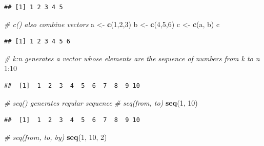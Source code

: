 \documentclass[]{book}
\newenvironment{Shaded}{\begin{snugshade}}{\end{snugshade}}
\newcommand{\KeywordTok}[1]{\textcolor[rgb]{0.13,0.29,0.53}{\textbf{{#1}}}}
\newcommand{\DecValTok}[1]{\textcolor[rgb]{0.00,0.00,0.81}{{#1}}}
\newcommand{\StringTok}[1]{\textcolor[rgb]{0.31,0.60,0.02}{{#1}}}
\newcommand{\CommentTok}[1]{\textcolor[rgb]{0.56,0.35,0.01}{\textit{{#1}}}}
\newcommand{\NormalTok}[1]{{#1}}
\begin{document}
\begin{verbatim}
## [1] 1 2 3 4 5
\end{verbatim}

\begin{Shaded}
\begin{Highlighting}[]
\CommentTok{# c() also combine vectors}
\NormalTok{a <-}\StringTok{ }\KeywordTok{c}\NormalTok{(}\DecValTok{1}\NormalTok{,}\DecValTok{2}\NormalTok{,}\DecValTok{3}\NormalTok{)}
\NormalTok{b <-}\StringTok{ }\KeywordTok{c}\NormalTok{(}\DecValTok{4}\NormalTok{,}\DecValTok{5}\NormalTok{,}\DecValTok{6}\NormalTok{)}
\NormalTok{c <-}\StringTok{ }\KeywordTok{c}\NormalTok{(a, b)}
\NormalTok{c}
\end{Highlighting}
\end{Shaded}

\begin{verbatim}
## [1] 1 2 3 4 5 6
\end{verbatim}

\begin{Shaded}
\begin{Highlighting}[]
\CommentTok{# k:n generates a vector whose elements are the sequence of numbers from k to n}
\DecValTok{1}\NormalTok{:}\DecValTok{10}
\end{Highlighting}
\end{Shaded}

\begin{verbatim}
##  [1]  1  2  3  4  5  6  7  8  9 10
\end{verbatim}

\begin{Shaded}
\begin{Highlighting}[]
\CommentTok{# seq() generates regular sequence}
\CommentTok{# seq(from, to)}
\KeywordTok{seq}\NormalTok{(}\DecValTok{1}\NormalTok{, }\DecValTok{10}\NormalTok{)}
\end{Highlighting}
\end{Shaded}

\begin{verbatim}
##  [1]  1  2  3  4  5  6  7  8  9 10
\end{verbatim}

\begin{Shaded}
\begin{Highlighting}[]
\CommentTok{# seq(from, to, by)}
\KeywordTok{seq}\NormalTok{(}\DecValTok{1}\NormalTok{, }\DecValTok{10}\NormalTok{, }\DecValTok{2}\NormalTok{)}
\end{Highlighting}
\end{Shaded}
\end{document}
